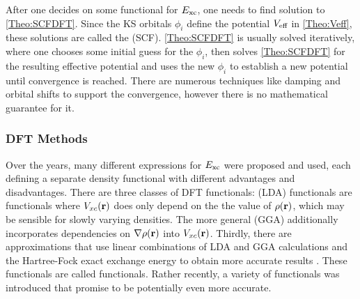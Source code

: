 \documentclass[8.5pt,twoside,twocolumn]{article}
\renewcommand\r{\bo r}
\theoremstyle{standard}
\begin{document}
After one decides on some functional for $E_{\text{xc}}$, one needs to find  solution
to \eqref{Theo:SCFDFT}. Since the KS orbitals $\phi_i$ define the potential $V_{\text{eff}}$ in
\eqref{Theo:Veff}, these solutions are called the  (SCF). 
\eqref{Theo:SCFDFT} is usually solved iteratively, where one chooses some initial guess
for the $\phi_i$, then solves \eqref{Theo:SCFDFT} for the resulting effective potential
and uses the new $\phi_i$ to establish a new potential until convergence is reached.
There are numerous techniques like damping and orbital shifts to support the
convergence, however there is no mathematical guarantee for it. 


\subsubsection{DFT Methods}
\label{Sec:Theo:Functionals}
Over the years, many different expressions for $E_{\text{xc}}$ were proposed and used, each
defining a separate density functional with different advantages and disadvantages. There
are three classes of DFT functionals:  (LDA) functionals
are functionals where $\vxc(\r)$ does only depend on the the value of $\rho(\r)$, which may
be sensible for slowly varying densities. The more general 
(GGA) additionally incorporates dependencies on $\nabla\rho(\r)$ into $\vxc(\r)$. Thirdly,
there are approximations that use linear combinations of LDA and GGA calculations and the
Hartree-Fock exact exchange energy to obtain more accurate results \cite{Becke1993}. 
These functionals are called  functionals. Rather recently, a variety of
 functionals was introduced that promise to be potentially even more accurate.
\end{document}
